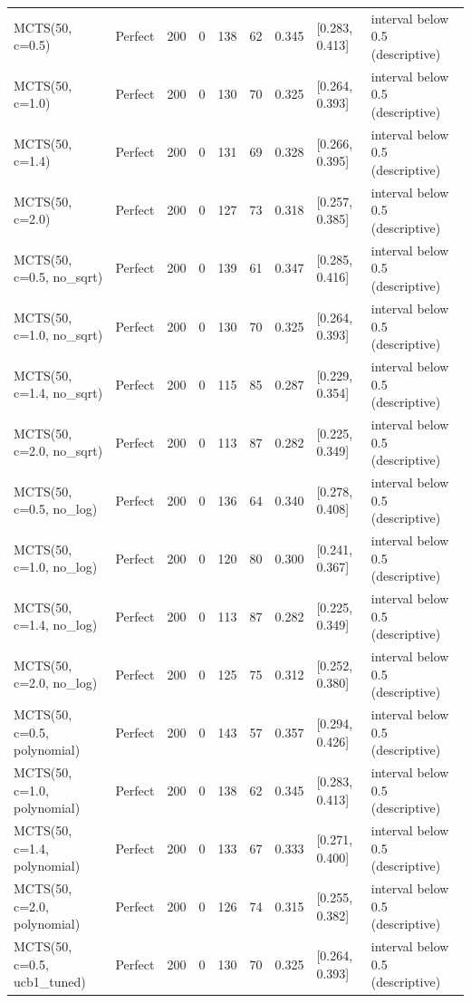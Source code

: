 \begin{table}[!t]
\begin{tabular}{llrrrrrll}
MCTS(50, c=0.5) & Perfect & 200 & 0 & 138 & 62 & 0.345 & [0.283, 0.413] & interval below 0.5 (descriptive) \\
MCTS(50, c=1.0) & Perfect & 200 & 0 & 130 & 70 & 0.325 & [0.264, 0.393] & interval below 0.5 (descriptive) \\
MCTS(50, c=1.4) & Perfect & 200 & 0 & 131 & 69 & 0.328 & [0.266, 0.395] & interval below 0.5 (descriptive) \\
MCTS(50, c=2.0) & Perfect & 200 & 0 & 127 & 73 & 0.318 & [0.257, 0.385] & interval below 0.5 (descriptive) \\
MCTS(50, c=0.5, no\_sqrt) & Perfect & 200 & 0 & 139 & 61 & 0.347 & [0.285, 0.416] & interval below 0.5 (descriptive) \\
MCTS(50, c=1.0, no\_sqrt) & Perfect & 200 & 0 & 130 & 70 & 0.325 & [0.264, 0.393] & interval below 0.5 (descriptive) \\
MCTS(50, c=1.4, no\_sqrt) & Perfect & 200 & 0 & 115 & 85 & 0.287 & [0.229, 0.354] & interval below 0.5 (descriptive) \\
MCTS(50, c=2.0, no\_sqrt) & Perfect & 200 & 0 & 113 & 87 & 0.282 & [0.225, 0.349] & interval below 0.5 (descriptive) \\
MCTS(50, c=0.5, no\_log) & Perfect & 200 & 0 & 136 & 64 & 0.340 & [0.278, 0.408] & interval below 0.5 (descriptive) \\
MCTS(50, c=1.0, no\_log) & Perfect & 200 & 0 & 120 & 80 & 0.300 & [0.241, 0.367] & interval below 0.5 (descriptive) \\
MCTS(50, c=1.4, no\_log) & Perfect & 200 & 0 & 113 & 87 & 0.282 & [0.225, 0.349] & interval below 0.5 (descriptive) \\
MCTS(50, c=2.0, no\_log) & Perfect & 200 & 0 & 125 & 75 & 0.312 & [0.252, 0.380] & interval below 0.5 (descriptive) \\
MCTS(50, c=0.5, polynomial) & Perfect & 200 & 0 & 143 & 57 & 0.357 & [0.294, 0.426] & interval below 0.5 (descriptive) \\
MCTS(50, c=1.0, polynomial) & Perfect & 200 & 0 & 138 & 62 & 0.345 & [0.283, 0.413] & interval below 0.5 (descriptive) \\
MCTS(50, c=1.4, polynomial) & Perfect & 200 & 0 & 133 & 67 & 0.333 & [0.271, 0.400] & interval below 0.5 (descriptive) \\
MCTS(50, c=2.0, polynomial) & Perfect & 200 & 0 & 126 & 74 & 0.315 & [0.255, 0.382] & interval below 0.5 (descriptive) \\
MCTS(50, c=0.5, ucb1\_tuned) & Perfect & 200 & 0 & 130 & 70 & 0.325 & [0.264, 0.393] & interval below 0.5 (descriptive) \\

\end{tabular}
\end{table}
